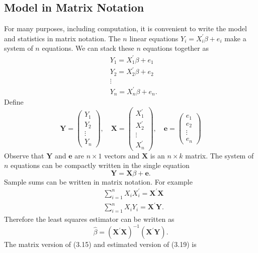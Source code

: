 \documentclass[10pt]{article}
\begin{document}
\subsection{Model in Matrix Notation}
For many purposes, including computation, it is convenient to write the model and statistics in matrix notation. The $n$ linear equations $Y_{i}=X_{i}^{\prime} \beta+e_{i}$ make a system of $n$ equations. We can stack these $n$ equations together as
$$
\begin{aligned}
&Y_{1}=X_{1}^{\prime} \beta+e_{1} \\
&Y_{2}=X_{2}^{\prime} \beta+e_{2} \\
&\vdots \\
&Y_{n}=X_{n}^{\prime} \beta+e_{n} .
\end{aligned}
$$
Define
$$
\boldsymbol{Y}=\left(\begin{array}{c}
Y_{1} \\
Y_{2} \\
\vdots \\
Y_{n}
\end{array}\right), \quad \boldsymbol{X}=\left(\begin{array}{c}
X_{1}^{\prime} \\
X_{2}^{\prime} \\
\vdots \\
X_{n}^{\prime}
\end{array}\right), \quad \boldsymbol{e}=\left(\begin{array}{c}
e_{1} \\
e_{2} \\
\vdots \\
e_{n}
\end{array}\right)
$$
Observe that $\boldsymbol{Y}$ and $\boldsymbol{e}$ are $n \times 1$ vectors and $\boldsymbol{X}$ is an $n \times k$ matrix. The system of $n$ equations can be compactly written in the single equation
$$
\boldsymbol{Y}=\boldsymbol{X} \beta+\boldsymbol{e} .
$$
Sample sums can be written in matrix notation. For example
$$
\begin{aligned}
&\sum_{i=1}^{n} X_{i} X_{i}^{\prime}=\boldsymbol{X}^{\prime} \boldsymbol{X} \\
&\sum_{i=1}^{n} X_{i} Y_{i}=\boldsymbol{X}^{\prime} \boldsymbol{Y} .
\end{aligned}
$$
Therefore the least squares estimator can be written as
$$
\widehat{\beta}=\left(\boldsymbol{X}^{\prime} \boldsymbol{X}\right)^{-1}\left(\boldsymbol{X}^{\prime} \boldsymbol{Y}\right) .
$$
The matrix version of (3.15) and estimated version of (3.19) is
\end{document}
